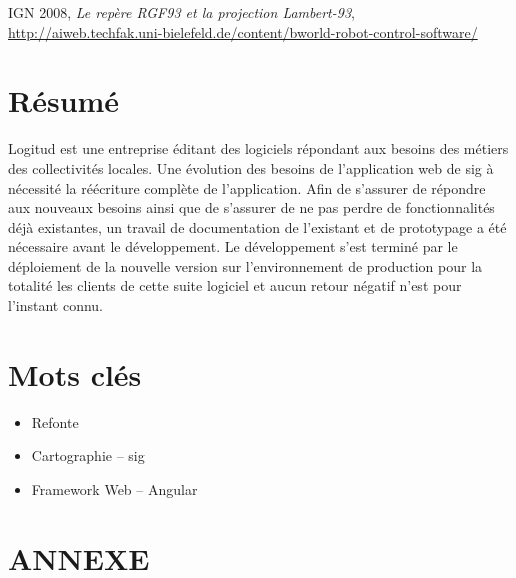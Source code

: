 \documentclass{rapportUHA40}
\begin{document}
\newpage
\printglossaries{}
\begin{thebibliography}{9}
  IGN 2008, \emph{Le repère RGF93 et la projection Lambert-93}, \url{http://aiweb.techfak.uni-bielefeld.de/content/bworld-robot-control-software/}
\end{thebibliography}
\newpage

\section*{Résumé}

Logitud est une entreprise éditant des logiciels répondant aux besoins des
métiers des collectivités locales. Une évolution des besoins de l'application
web de \gls{sig} à nécessité la réécriture complète de l'application. Afin de
s'assurer de répondre aux nouveaux besoins ainsi que de s'assurer de ne pas
perdre de fonctionnalités déjà existantes, un travail de documentation de
l'existant et de prototypage a été nécessaire avant le développement. Le
développement s'est terminé par le déploiement de la nouvelle version sur
l'environnement de production pour la totalité les clients de cette suite
logiciel et aucun retour négatif n'est pour l'instant connu.

\section*{Mots clés}
\begin{itemize}
  \item Refonte
  \item Cartographie – \gls{sig}
  \item Framework Web – Angular
\end{itemize}

\clearpage
\appendix
{}
\section*{ANNEXE}
\end{document}

